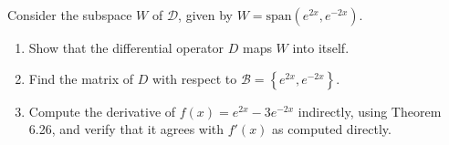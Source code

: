 \documentclass[11pt,letterpaper,boxed]{hmcpset}
\newcommand{\pn}[1]{\left( #1 \right)}
\newcommand{\crb}[1]{\left\{ #1 \right\}}
\newcommand{\spn}[1]{\text{span}\pn{#1}}
\begin{document}
\begin{solution}
\vfill
\end{solution}
\newpage

\begin{problem}[Poole 6.6 \#14]
Consider the subspace $W$ of $\mathcal{D}$, given by $W = \spn{e^{2x},e^{-2x}}$.
\begin{enumerate}
\item Show that the differential operator $D$ maps $W$ into itself.
\item Find the matrix of $D$ with respect to $\mathcal{B} = \crb{e^{2x},e^{-2x}}$.
\item Compute the derivative of $f(x) = e^{2x}-3e^{-2x}$ indirectly, using Theorem 6.26,
and verify that it agrees with $f'(x)$ as computed directly.
\end{enumerate}
\end{problem}

\begin{solution}
\vfill
\end{solution}
\newpage

\begin{problem}[Poole 6.6 \#18]

\end{problem}

\begin{solution}
\vfill
\end{solution}
\newpage

\begin{problem}[Poole 6.6 \#22]

\end{problem}

\begin{solution}
\vfill
\end{solution}
\newpage

\begin{problem}[Poole 6.6 \#32]

\end{problem}

\begin{solution}
\vfill
\end{solution}
\newpage

\begin{problem}[Poole 6.6 \#34]

\end{problem}

\begin{solution}
\vfill
\end{solution}
\end{document}
